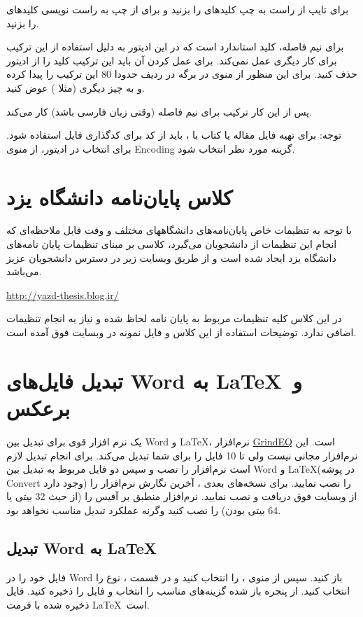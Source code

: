 برای تایپ از راست به چپ کلیدهای   را بزنید و برای از چپ به راست نویسی کلیدهای   را بزنید.

برای نیم فاصله، کلید استاندارد   است که در این ادیتور به دلیل استفاده از این ترکیب برای کار دیگری عمل نمی‌کند.
برای عمل کردن آن باید این ترکیب کلید را از ادیتور حذف کنید. برای این منظور از منوی 
 در برگه   در ردیف حدودا 80  این ترکیب را پیدا کرده و به چیز دیگری (مثلا ) عوض کنید.

 پس از این کار ترکیب   برای نیم فاصله (وقتی زبان فارسی باشد) کار می‌کند.
 
 توجه: برای تهیه فایل مقاله یا کتاب با \XePersian، باید از کد   برای کدگذاری فایل استفاده شود. برای انتخاب در ادیتور، از منوی
 Encoding  گزینه مورد نظر انتخاب شود.
 \section{کلاس پایان‌نامه دانشگاه یزد}
 با توجه به تنظیمات خاص پایان‌نامه‌های دانشگاههای مختلف و وقت قابل ملاحظه‌ای که انجام این تنظیمات از دانشجویان می‌گیرد، کلاسی بر مبنای تنظیمات پایان نامه‌های دانشگاه یزد ایجاد شده است و از طریق وبسایت زیر در دسترس دانشجویان عزیز می‌باشد.
 
 \centerline{\href{http://yazd-thesis.blog.ir/}{http://yazd-thesis.blog.ir/}}
 
 در این کلاس کلیه تنظیمات مربوط به پایان نامه لحاظ شده و نیاز به انجام تنظیمات اضافی ندارد. توضیحات استفاده از این کلاس و فایل نمونه در وبسایت فوق آمده است.
 \section{تبدیل فایل‌های Word  به \LaTeX\   و برعکس}
 یک نرم افزار قوی برای تبدیل بین Word  و \LaTeX، نرم‌افزار \href{http://www.grindeq.com/}{GrindEQ}  است.
 این نرم‌افزار مجانی نیست ولی تا 10 فایل را برای شما تبدیل می‌کند. برای انجام تبدیل لازم است نرم‌افزار   را نصب و سپس
 دو فایل مربوط به تبدیل بین Word  و \LaTeX  (در پوشه Convert وجود دارد) را نصب نمایید.
 برای نسخه‌های بعدی ، آخرین نگارش نرم‌افزار را از وبسایت فوق دریافت و نصب نمایید. نرم‌افزار منطبق بر آفیس را (از حیث 32 بیتی یا 64 بیتی بودن) را نصب کنید وگرنه عملکرد تبدیل مناسب نخواهد بود.
 \subsection{تبدیل Word به \LaTeX}
 فایل خود را در Word باز کنید. سپس از منوی ،
   را انتخاب کنید و در قسمت ، نوع 
 را انتخاب کنید.  از پنجره باز شده گزینه‌های مناسب را انتخاب و فایل را ذخیره کنید. فایل ذخیره شده با فرمت \LaTeX \  است.
 

